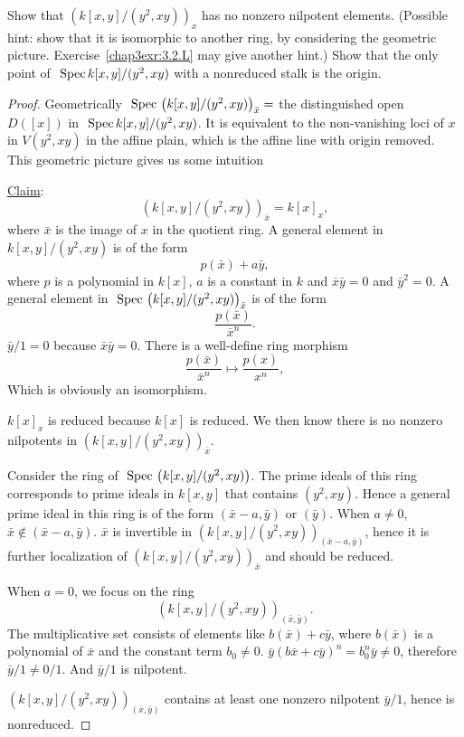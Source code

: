\begin{exr}
Show that  $\left(k[x, y]/(y^2, xy)\right)_x$  has no nonzero nilpotent elements.
(Possible hint: show that it is isomorphic to another ring, by considering the geometric picture. Exercise~\ref{chap3exr:3.2.L} may give another hint.) Show that the only point of $\text{ Spec\,} k[x, y]/(y^2 , xy)$ with a nonreduced stalk is the origin.

\end{exr}
\begin{proof}
Geometrically $\text{ Spec\,} \left(k[x, y]/(y^2, xy)\right)_{\bar{x}}=$ the distinguished open $D([x])$ in $\text{ Spec\,} k[x, y]/(y^2, xy)$. It is equivalent to the non-vanishing loci of $x$ in $V(y^2,xy)$ in the affine plain, which is the affine line with origin removed. This geometric picture gives us some intuition

\underline{Claim}:
$$
\left(k[x, y]/(y^2, xy)\right)_{\bar{x}}=k[x]_{x},
$$
where $\bar{x}$ is the image of $x$ in the quotient ring. A general element in $k[x, y]/(y^2, xy)$ is of the form
$$
p(\bar{x})+a\bar{y},
$$
where $p$ is a polynomial in $k[x]$, $a$ is a constant in $k$ and $\bar{x}\bar{y}=0$ and $\bar{y}^2=0$.
A general element in $\text{ Spec\,} \left(k[x, y]/(y^2, xy)\right)_{\bar{x}}$ is of the form
$$
\frac{p(\bar{x})}{\bar{x}^n}.
$$
$\bar{y}/1=0$ because $\bar{x}\bar{y}=0$.
 There is a well-define ring morphism
$$
\frac{p(\bar{x})}{\bar{x}^n}\mapsto \frac{p(x)}{x^n},
$$
Which is obviously an isomorphism.

$k[x]_x$ is reduced because $k[x]$ is reduced. We then know there is no nonzero nilpotents in $\left(k[x, y]/(y^2, xy)\right)_{\bar{x}}$.

Consider the ring of $\text{ Spec\,} \left(k[x, y]/(y^2, xy)\right)$. The prime ideals of this ring corresponds to prime ideals in $k[x,y]$ that contains $(y^2,xy)$. Hence a general prime ideal in this ring is of the form $(\bar{x}-a, \bar{y})$ or $(\bar{y})$. 
When $a\neq 0$, $\bar{x}\notin (\bar{x}-a,\bar{y})$. $\bar{x}$ is invertible in $\left(k[x, y]/(y^2, xy)\right)_{(\bar{x}-a,\bar{y})}$, hence it is further localization of $\left(k[x, y]/(y^2, xy)\right)_{\bar{x}}$ and should be reduced.

When $a=0$, we focus on the ring
$$
\left(k[x, y]/(y^2, xy)\right)_{(\bar{x},\bar{y})}.
$$
The multiplicative set consists of elements like $b(\bar{x})+c\bar{y}$, where $b(\bar{x})$ is a polynomial of $\bar{x}$ and the constant term $b_0\neq 0$. $\bar{y}(b\bar{x}+c\bar{y})^n=b_0^n\bar{y}\neq 0$, therefore $\bar{y}/1\neq 0/1$. And $\bar{y}/1$ is nilpotent.

$\left(k[x, y]/(y^2, xy)\right)_{(\bar{x},\bar{y})}$ contains at least one nonzero nilpotent $\bar{y}/1$, hence is nonreduced.
\end{proof}


